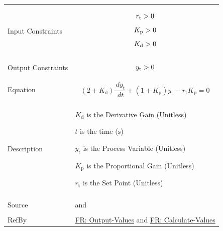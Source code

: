 \documentclass[12pt]{article}
\newcommand{\gt}{\ensuremath >}
\begin{document}
\begin{minipage}{\textwidth}
\begin{tabular}{>{\raggedright}p{}>{\raggedright\arraybackslash}p{}}
\\ \midrule \\
Input Constraints & \begin{displaymath}
                    {r_{\text{t}}}\gt{}0
                    \end{displaymath}
                    \begin{displaymath}
                    {K_{\text{p}}}\gt{}0
                    \end{displaymath}
                    \begin{displaymath}
                    {K_{\text{d}}}\gt{}0
                    \end{displaymath}
\\ \midrule \\
Output Constraints & \begin{displaymath}
                     {y_{\text{t}}}\gt{}0
                     \end{displaymath}
\\ \midrule \\
Equation & \begin{displaymath}
           \left(2+{K_{\text{d}}}\right) \frac{\,d{y_{\text{t}}}}{\,dt}+\left(1+{K_{\text{p}}}\right) {y_{\text{t}}}-{r_{\text{t}}} {K_{\text{p}}}=0
           \end{displaymath}
\\ \midrule \\
Description & \begin{symbDescription}
              \item{${K_{\text{d}}}$ is the Derivative Gain (Unitless)}
              \item{$t$ is the time (${\text{s}}$)}
              \item{${y_{\text{t}}}$ is the Process Variable (Unitless)}
              \item{${K_{\text{p}}}$ is the Proportional Gain (Unitless)}
              \item{${r_{\text{t}}}$ is the Set Point (Unitless)}
              \end{symbDescription}
\\ \midrule \\
Source & \cite{abbasi2015} and \cite{johnson2008}
         
\\ \midrule \\
RefBy & \hyperref[outputValues]{FR: Output-Values} and \hyperref[calculateValues]{FR: Calculate-Values}
        
\\ \bottomrule
\end{tabular}
\end{minipage}
\end{document}
